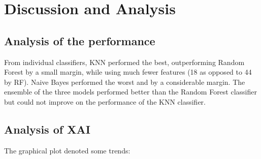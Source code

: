 \documentclass[journal,comsoc]{IEEEtran}
\begin{document}
\section{ Discussion and Analysis}
\subsection{Analysis of the performance}
From individual classifiers, KNN performed the best, outperforming Random Forest by a small margin, while using much fewer features (18 as opposed to 44 by RF). Naive Bayes performed the worst and by a considerable margin. The ensemble of the three models performed better than the Random Forest classifier but could not improve on the performance of the KNN classifier.

\subsection{Analysis of XAI}
The graphical plot denoted some trends:
\end{document}

